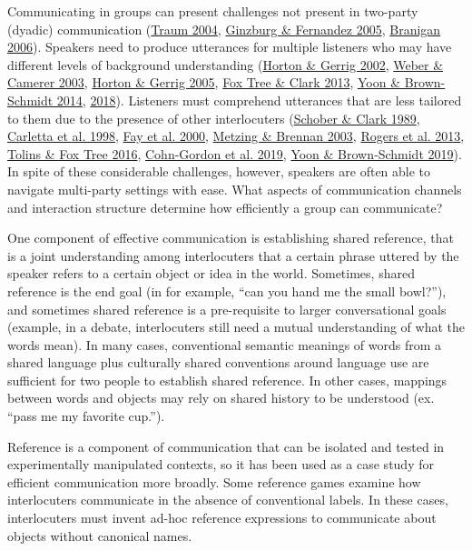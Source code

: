 \documentclass[
  english,
  a4paper,
]{article}
\begin{document}
Communicating in groups can present challenges not present in two-party (dyadic) communication (\protect\hyperlink{ref-traum2004}{Traum 2004}, \protect\hyperlink{ref-ginzburg2005}{Ginzburg \& Fernandez 2005}, \protect\hyperlink{ref-branigan2006}{Branigan 2006}). Speakers need to produce utterances for multiple listeners who may have different levels of background understanding (\protect\hyperlink{ref-horton2002}{Horton \& Gerrig 2002}, \protect\hyperlink{ref-weber2003}{Weber \& Camerer 2003}, \protect\hyperlink{ref-horton2005}{Horton \& Gerrig 2005}, \protect\hyperlink{ref-fox-tree2013}{Fox Tree \& Clark 2013}, \protect\hyperlink{ref-yoon2014}{Yoon \& Brown-Schmidt 2014}, \protect\hyperlink{ref-yoon2018}{2018}). Listeners must comprehend utterances that are less tailored to them due to the presence of other interlocuters (\protect\hyperlink{ref-schober1989}{Schober \& Clark 1989}, \protect\hyperlink{ref-carletta1998}{Carletta et al. 1998}, \protect\hyperlink{ref-fay2000}{Fay et al. 2000}, \protect\hyperlink{ref-metzing2003}{Metzing \& Brennan 2003}, \protect\hyperlink{ref-rogers2013}{Rogers et al. 2013}, \protect\hyperlink{ref-tolins2016}{Tolins \& Fox Tree 2016}, \protect\hyperlink{ref-cohngordon}{Cohn-Gordon et al. 2019}, \protect\hyperlink{ref-yoon2019}{Yoon \& Brown‐Schmidt 2019}). In spite of these considerable challenges, however, speakers are often able to navigate multi-party settings with ease. What aspects of communication channels and interaction structure determine how efficiently a group can communicate?

One component of effective communication is establishing shared reference, that is a joint understanding among interlocuters that a certain phrase uttered by the speaker refers to a certain object or idea in the world. Sometimes, shared reference is the end goal (in for example, ``can you hand me the small bowl?''), and sometimes shared reference is a pre-requisite to larger conversational goals (example, in a debate, interlocuters still need a mutual understanding of what the words mean). In many cases, conventional semantic meanings of words from a shared language plus culturally shared conventions around language use are sufficient for two people to establish shared reference. In other cases, mappings between words and objects may rely on shared history to be understood (ex. ``pass me my favorite cup.'').

Reference is a component of communication that can be isolated and tested in experimentally manipulated contexts, so it has been used as a case study for efficient communication more broadly. Some reference games examine how interlocuters communicate in the absence of conventional labels. In these cases, interlocuters must invent ad-hoc reference expressions to communicate about objects without canonical names.
\end{document}
